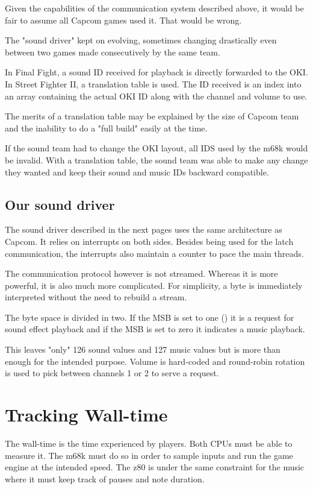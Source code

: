 Given the capabilities of the communication system described above, it would be fair to assume all Capcom games used it. That would be wrong.

The "sound driver" kept on evolving, sometimes changing drastically even between two games made consecutively by the same team. 

In Final Fight, a sound ID received for playback is directly forwarded to the OKI. In Street Fighter II, a translation table is used. The ID received is an index into an array containing the actual OKI ID along with the channel and volume to use.

The merits of a translation table may be explained by the size of Capcom team and the inability to do a "full build" easily at the time.

If the sound team had to change the OKI layout, all IDS used by the m68k would be invalid. With a translation table, the sound team was able to make any change they wanted and keep their sound and music IDs backward compatible.


\subsection{Our sound driver}

The sound driver described in the next pages uses the same architecture as Capcom. It relies on interrupts on both sides. Besides being used for the latch communication, the interrupts also maintain a counter to pace the main threads.


The communication protocol however is not streamed. Whereas it is more powerful, it is also much more complicated. For simplicity, a byte is immediately interpreted without the need to rebuild a stream.

The byte space is divided in two. If the MSB is set to one () it is a request for sound effect playback and if the MSB is set to zero  it indicates a music playback. 

This leaves "only" 126 sound values and 127 music values but is more than enough for the intended purpose. Volume is hard-coded and round-robin rotation is used to pick between channels 1 or 2 to serve a request. 

\section{Tracking Wall-time}
The wall-time is the time experienced by players. Both CPUs must be able to measure it. The m68k must do so in order to sample inputs and run the game engine at the intended speed. The z80 is under the same constraint for the music where it must keep track of pauses and note duration. 

